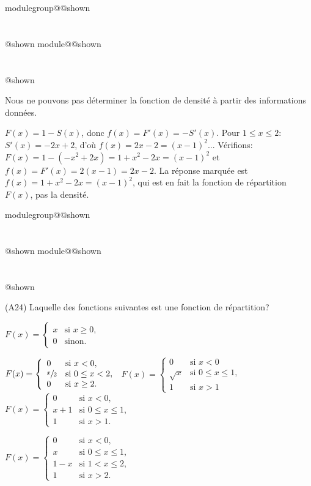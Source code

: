 \documentclass{Evaluation}
\makeatletter
\newcommand{\currentmodulekey}{}
\newcommand{\currentmoduletitle}{}
\newcommand{\currentgroupkey}{}
\newcommand{\currentgrouptitle}{}
\newcommand{\showmoduleifneeded}{%
  \ifx\currentgroupkey\empty\else
    \expandafter\ifx\csname modulegroup@\currentgroupkey @shown\endcsname\relax
      \section*{\currentgrouptitle}%
      \expandafter\gdef\csname modulegroup@\currentgroupkey @shown\endcsname{1}%
    \fi
  \fi
  \expandafter\ifx\csname module@\currentmodulekey @shown\endcsname\relax
    \section*{\currentmoduletitle}%
    \expandafter\gdef\csname module@\currentmodulekey @shown\endcsname{1}%
  \fi
}
\newenvironment{A24}{\showmoduleifneeded}{}
\makeatother
\begin{document}
\begin{questions}
\begin{A24}
\begin{checkboxes}
      		

\choice Nous ne pouvons pas déterminer la fonction de densité à partir des informations données.

\end{checkboxes}

\begin{solution}
    $F(x)=1-S(x)$, donc $f(x)=F'(x)=-S'(x)$. Pour $1\leq x\leq 2$: $S'(x)=-2x+2$, d'où $f(x)=2x-2=(x-1)^2$... Vérifions: $F(x)=1-(-x^2+2x)=1+x^2-2x=(x-1)^2$ et $f(x)=F'(x)=2(x-1)=2x-2$. La réponse marquée est $f(x)=1+x^2-2x=(x-1)^2$, qui est en fait la fonction de répartition $F(x)$, pas la densité.
\end{solution}
\end{A24}

\begin{A24}
\question (A24)
Laquelle des fonctions suivantes est une fonction de répartition? 

\begin{checkboxes}
\choice $F(x)=\left\{
			\begin{array}{ll}
			x  & \mbox{si } x \ge 0, \\
			0 & \mbox{sinon.}
			\end{array}
			\right. $
		
\choice $ F(x) = \left\{
			\begin{array}{ll}
			0  & \mbox{si } x<0, \\
			\displaystyle \sfrac{x}{2} & \mbox{si } 0\leq x < 2,\\
			0 & \mbox{si } x \geq 2.
			\end{array}
			\right. $
\correctchoice $ F(x) = \left\{
			\begin{array}{ll}
            0 & \mbox{si } x<0\\
			\sqrt{x}  & \mbox{si } 0\leq x\leq 1, \\
			1 & \mbox{si } x>1
			\end{array}
			\right. $
\choice $ F(x) = \left\{
			\begin{array}{ll}
			0  & \mbox{si } x < 0, \\
			x + 1& \mbox{si } 0 \leq x \leq 1,\\
			1 &  \mbox{si } x > 1.
			\end{array}
			\right. $

   \choice $ F(x) = \left\{
			\begin{array}{ll}
			0  & \mbox{si } x < 0, \\
			x & \mbox{si } 0 \leq x \leq 1,\\
                1-x & \mbox{si } 1< x \leq 2,\\ 
			1 &  \mbox{si } x> 2.
			\end{array}
			\right. $
\end{checkboxes}


\end{A24}
\end{questions}
\end{document}
